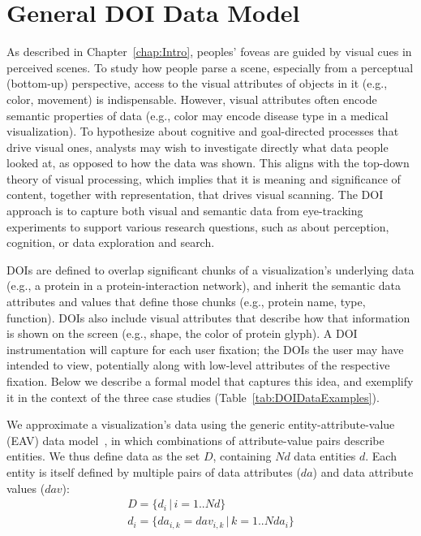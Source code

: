 \section{General DOI Data Model}
\label{sec:DOIDataModel}
As described in Chapter~\ref{chap:Intro}, peoples' foveas are guided by visual cues in perceived scenes. To study how people parse a scene, especially from a perceptual (bottom-up) perspective, access to the visual attributes of objects in it (e.g., color, movement) is indispensable. However, visual attributes often encode semantic properties of data (e.g., color may encode disease type in a medical visualization). To hypothesize about cognitive and goal-directed processes that drive visual ones, analysts may wish to investigate directly what data people looked at, as opposed to how the data was shown. This aligns with the top-down theory of visual processing, which implies that it is meaning and significance of content, together with representation, that drives visual scanning. The DOI approach is to capture both visual and semantic data from eye-tracking experiments to support various research questions, such as about perception, cognition, or data exploration and search. 

DOIs are defined to overlap significant chunks of a visualization's underlying data (e.g., a protein in a protein-interaction network), and inherit the semantic data attributes and values that define those chunks (e.g., protein name, type, function). DOIs also include visual attributes that describe how that information is shown on the screen (e.g., shape, the color of protein glyph). A DOI instrumentation will capture for each user fixation; the DOIs the user may have intended to view, potentially along with low-level attributes of the respective fixation. Below we describe a formal model that captures this idea, and exemplify it in the context of the three case studies (Table~\ref{tab:DOIDataExamples}).

We approximate a visualization's data using the generic entity-attribute-value (EAV) data model~\cite{deran1991entity}, in which combinations of attribute-value pairs describe entities.  We thus define data as the set $D$, containing $N\!d$ data entities $d$. Each entity is itself defined by multiple pairs of data attributes ($da$) and data attribute values ($dav$):
\begin{equation*}
\begin{split} 
D = \{d_i \,|\, i=1..N\!d\} \\
d_{i} = \{da_{i,k} = dav_{i,k} \,|\, k=1..N\!da_{i}\}
\end{split}
\end{equation*}

